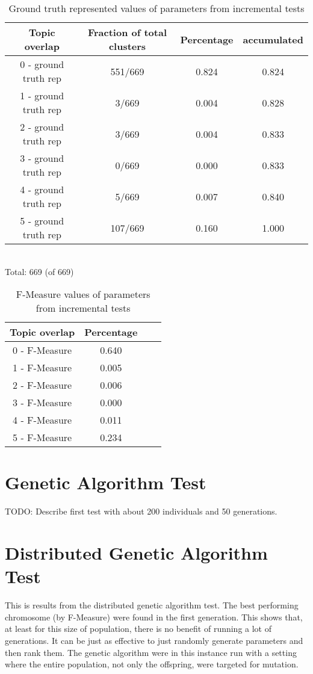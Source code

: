 \begin{table}
\begin{center}
\begin{tabular}{|c|c|c|c|}
\hline
Topic overlap &  Fraction of total clusters & Percentage  & accumulated\\ 
\hline
0 - ground truth rep & 551/669 & 0.824 & 0.824 \\
1 - ground truth rep & 3/669 & 0.004 & 0.828 \\
2 - ground truth rep & 3/669 & 0.004 & 0.833\\
3 - ground truth rep & 0/669 & 0.000 & 0.833\\
4 - ground truth rep & 5/669 & 0.007 & 0.840\\
5 - ground truth rep & 107/669 & 0.160 & 1.000\\
\hline
\end{tabular}
\\Total: 669 (of  669)
\end{center}
\caption{Ground truth represented values of parameters from incremental tests}
\label{tab:incrementalparametersgroundtruthrep}
\end{table}

\begin{table}
\begin{center}
\begin{tabular}{|c|c|c|c|}
\hline
Topic overlap & Percentage\\ 
\hline
0 - F-Measure & 0.640\\
1 - F-Measure & 0.005\\
2 - F-Measure & 0.006\\
3 - F-Measure & 0.000\\
4 - F-Measure & 0.011\\
5 - F-Measure & 0.234\\
\hline
\end{tabular}
\end{center}
\caption{F-Measure values of parameters from incremental tests}
\label{tab:incrementalparametersfmeasure}
\end{table}

\section{Genetic Algorithm Test}
TODO: Describe first test with about 200 individuals and 50 generations.

\section{Distributed Genetic Algorithm Test}
This is results from the distributed genetic algorithm test. The best performing chromosome (by F-Measure) were found in the first generation. This shows that, at least for this size of population, there is no benefit of running a lot of generations. It can be just as effective to just randomly generate parameters and then rank them. The genetic algorithm were in this instance run with a setting where the entire population, not only the offspring, were targeted for mutation.

